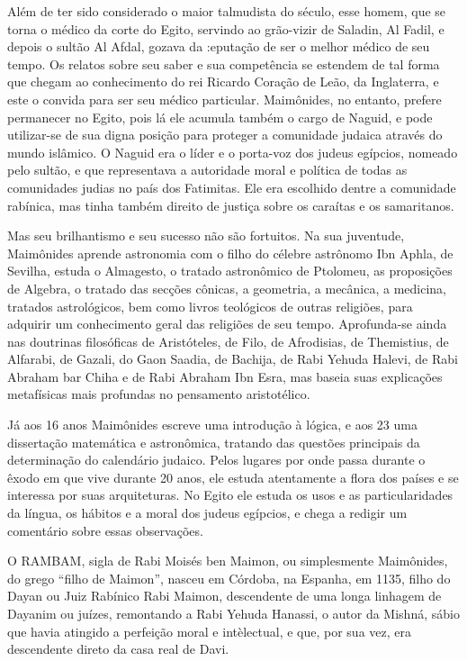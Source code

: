 Além de ter sido considerado o maior talmudista do século, esse ho­mem,
que se torna o médico da corte do Egito, servindo ao grão-vizir de
Sala­din, Al Fadil, e depois o sultão Al Afdal, gozava da :eputação de
ser o melhor médico de seu tempo. Os relatos sobre seu saber e sua
competência se esten­dem de tal forma que chegam ao conhecimento do rei
Ricardo Coração de Leão, da Inglaterra, e este o convida para ser seu
médico particular. Maimônides, no entanto, prefere permanecer no Egito,
pois lá ele acumula também o cargo de Naguid, e pode utilizar-se de sua
digna posição para proteger a comunidade ju­daica através do mundo
islâmico. O Naguid era o líder e o porta-voz dos judeus egípcios,
nomeado pelo sultão, e que representava a autoridade moral e políti­ca
de todas as comunidades judias no país dos Fatimitas. Ele era escolhido
den­tre a comunidade rabínica, mas tinha também direito de justiça sobre
os caraí­tas e os samaritanos.

Mas seu brilhantismo e seu sucesso não são fortuitos. Na sua juven­tude,
Maimônides aprende astronomia com o filho do célebre astrônomo Ibn
Aphla, de Sevilha, estuda o Almagesto, o tratado astronômico de
Ptolomeu, as proposições de Algebra, o tratado das secções cônicas, a
geometria, a mecâni­ca, a medicina, tratados astrológicos, bem como
livros teológicos de outras re­ligiões, para adquirir um conhecimento
geral das religiões de seu tempo. Apro­funda-se ainda nas doutrinas
filosóficas de Aristóteles, de Filo, de Afrodisias, de Themistius, de
Alfarabi, de Gazali, do Gaon Saadia, de Bachija, de Rabi Ye­huda Halevi,
de Rabi Abraham bar Chiha e de Rabi Abraham Ibn Esra, mas ba­seia suas
explicações metafísicas mais profundas no pensamento aristotélico.

Já aos 16 anos Maimônides escreve uma introdução à lógica, e aos 23 uma
dissertação matemática e astronômica, tratando das questões principais
da determinação do calendário judaico. Pelos lugares por onde passa
durante o êxodo em que vive durante 20 anos, ele estuda atentamente a
flora dos países e se interessa por suas arquiteturas. No Egito ele
estuda os usos e as particulari­dades da língua, os hábitos e a moral
dos judeus egípcios, e chega a redigir um comentário sobre essas
observações.

O RAMBAM, sigla de Rabi Moisés ben Maimon, ou simplesmente Mai­mônides,
do grego ``filho de Maimon'', nasceu em Córdoba, na Espanha, em 1135,
filho do Dayan ou Juiz Rabínico Rabi Maimon, descendente de uma longa 
linhagem de Dayanim ou juízes, remontando a Rabi Yehuda Hanassi, o
autor da Mishná, sábio que havia atingido a perfeição moral e
intèlectual, e que, por sua vez, era descendente direto da casa real de
Davi.

